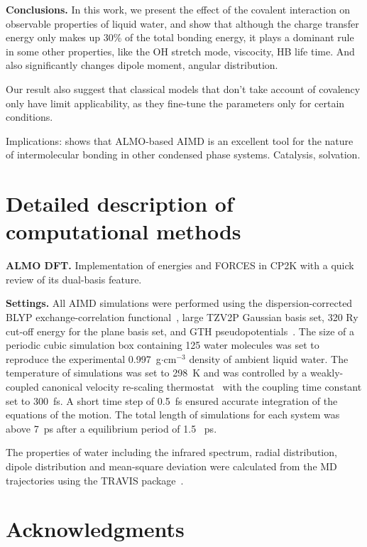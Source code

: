\documentclass[aps,prl,reprint,amsmath,amssymb]{revtex4-1}
\begin{document}
\textbf{Conclusions.} In this work, we present the effect of the covalent interaction on observable properties of liquid water, and show that although the charge transfer energy only makes up 30\% of the total bonding energy, it plays a dominant rule in some other properties, like the OH stretch mode, viscocity, HB life time. 
And also significantly changes dipole moment, angular distribution.
 
Our result also suggest that classical models that don't take account of covalency only have limit applicability, as they fine-tune the parameters only for certain conditions.
 
Implications: shows that ALMO-based AIMD is an excellent tool for the nature of intermolecular bonding in other condensed phase systems. 
Catalysis, solvation.

\section{Detailed description of computational methods}

\textbf{ALMO DFT.} Implementation of energies and FORCES in CP2K with a quick review of its dual-basis feature.

\textbf{Settings.} All AIMD simulations were performed using the dispersion-corrected~\cite{grimme2010consistent} BLYP exchange-correlation functional~\cite{becke1988density}, large TZV2P Gaussian basis set, 320 Ry cut-off energy for the plane basis set, and GTH pseudopotentials~\cite{goedecker1996separable,krack2005pseudopotentials}. 
The size of a periodic cubic simulation box containing 125 water molecules was set to reproduce the experimental 0.997~g$\cdot$cm$^{-3}$ density of ambient liquid water. 
The temperature of simulations was set to 298~K and was controlled by a weakly-coupled canonical velocity re-scaling thermostat~\cite{bussi2007canonical} with the coupling time constant set to 300~fs. 
A short time step of 0.5~fs ensured accurate integration of the equations of the motion. 
The total length of simulations for each system was above 7~ps after a equilibrium period of 1.5 ~ps.

The properties of water including the infrared spectrum, radial distribution, dipole distribution and mean-square deviation were calculated from the MD trajectories using the TRAVIS package~\cite{brehm2012travis}.  

\section{Acknowledgments} 
\end{document}
